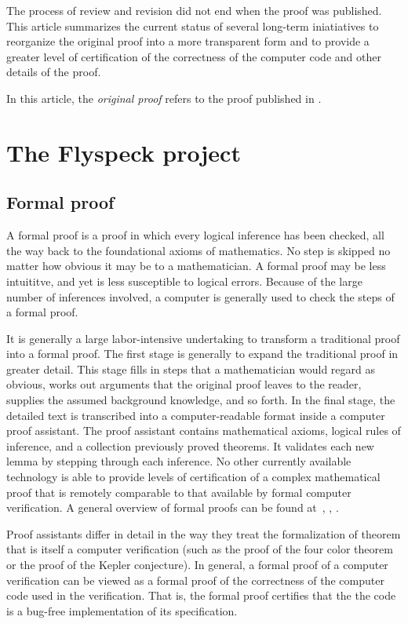 \documentclass[11pt]{amsart}
\begin{document}
The process of review and revision did not end when the proof was published.
This article summarizes the current status of several long-term iniatiatives to
reorganize the original proof into a more transparent form and to provide a greater
level of certification of the correctness of the computer code and other details of the proof.

In this article, the {\it original proof} refers to the proof published
in \cite{Hales:2006:DCG}.

\section{The Flyspeck project}

\subsection*{Formal proof}

A formal proof is a proof in which every logical inference has been checked, all the way back to the foundational axioms of mathematics.  No step is skipped no matter how obvious it may be to a mathematician.  
A formal proof may be less intuititve, and yet is less susceptible to logical
errors.  Because of the large number of inferences involved, a computer is generally used to check the steps of a formal proof.

It is generally a large labor-intensive
undertaking to transform a traditional proof
into a formal proof.   The first stage is generally to expand the traditional proof in greater detail.  This stage fills in steps that a mathematician would regard as obvious,  works out arguments that the original proof leaves to the reader,  supplies the assumed background knowledge, and so forth.  
In the final stage, the detailed text is transcribed into a computer-readable format inside
a computer proof assistant.  The proof assistant  contains  mathematical axioms, logical rules of inference, and a collection previously proved theorems. 
It validates each new lemma by stepping through each inference.  No other currently available technology is able to provide levels of certification of a complex mathematical proof that is remotely comparable to that available by formal computer verification.  A general overview
of formal proofs can be found at~\cite{gonthier:2008:formal}, \cite{Hales:2008:formal}, \cite{Harrison:2008:formal}.

Proof assistants differ in detail in the way they treat the formalization
of  theorem that is itself a computer verification (such as
the proof of the four color theorem or the proof of the Kepler conjecture).
In general, a formal proof of a computer verification can be viewed
as a formal proof of the correctness of the computer code used in the
verification.  That is, the formal proof certifies that the the code
is a bug-free implementation of its specification.
\end{document}
